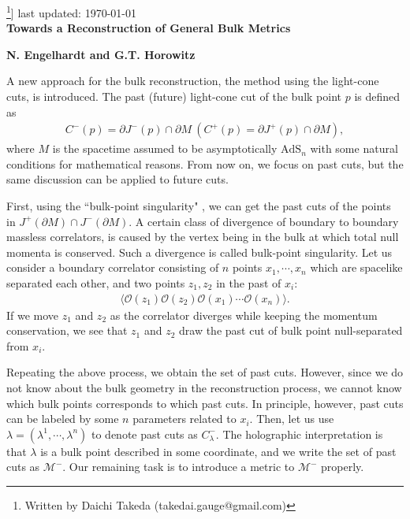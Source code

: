\documentclass[12pt]{article}
\date{}
\begin{document}
{\Large\noindent
\footnote{
Written by Daichi Takeda (takedai.gauge@gmail.com)
}]
\hfill{\normalsize last updated: \today}
\\[2mm]
\textbf{Towards a Reconstruction of General Bulk Metrics\cite{Engelhardt:2016wgb}
}
}

\noindent
\hfill
\textbf{N. Engelhardt and G.T. Horowitz}%

\vspace{12pt}
A new approach for the bulk reconstruction, the method using the light-cone cuts, is introduced.
The past (future) light-cone cut of the bulk point $p$ is defined as
\begin{align}
	C^-(p) = \partial J^-(p)\cap \partial M~(C^+(p) = \partial J^+(p)\cap \partial M),
\end{align}
where $M$ is the spacetime assumed to be asymptotically $\mathrm{AdS}_n$ with some natural conditions 
for mathematical reasons.
From now on, we focus on past cuts, but the same discussion can be applied to future cuts.

First, using the ``bulk-point singularity" \cite{Maldacena:2015iua}, we can get the past cuts of the points 
in $J^+(\partial M)\cap J^-(\partial M)$.
A certain class of divergence of boundary to boundary massless correlators,
is caused by the vertex being in the bulk at which total null momenta is conserved.
Such a divergence is called bulk-point singularity.
Let us consider a boundary correlator consisting of $n$ points $x_1,\cdots,x_n$ which are spacelike separated each other, 
and two points $z_1, z_2$ in the past of $x_i$:
\begin{align}
	\langle\mathcal O(z_1)\mathcal O(z_2)\mathcal O(x_1)\cdots\mathcal O(x_n)\rangle.
\end{align}
If we move $z_1$ and $z_2$ as the correlator diverges while keeping the momentum conservation,
we see that $z_1$ and $z_2$ draw the past cut of bulk point null-separated from $x_i$.

Repeating the above process, we obtain the set of past cuts.
However, since we do not know about the bulk geometry in the reconstruction process,
we cannot know which bulk points corresponds to which past cuts.
In principle, however, past cuts can be labeled by some $n$ parameters related to $x_i$.
Then, let us use $\lambda = (\lambda^1,\cdots,\lambda^n)$ to denote past cuts as $C^-_\lambda$.
The holographic interpretation is that $\lambda$ is a bulk point described in some coordinate,
and we write the set of past cuts as $\mathcal M^-$.
Our remaining task is to introduce a metric to $\mathcal M^-$ properly.
\end{document}
